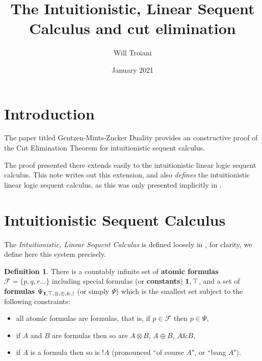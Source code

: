 \documentclass[12pt]{article}
\title{The Intuitionistic, Linear Sequent Calculus and cut elimination}
\author{Will Troiani}
\date{January 2021}
\theoremstyle{plain}
\theoremstyle{definition}
\newtheorem{defn}[thm]{Definition} %
\newcommand{\scr}[1]{\mathscr{#1}}
\begin{document}
\maketitle
\tableofcontents

\section{Introduction}
The paper titled Gentzen-Mints-Zucker Duality \cite{GMZ} provides an constructive proof  of the Cut Elimination Theorem for intuitionistic sequent calculus.

The proof presented there extends easily to the intuitionistic linear logic sequent calculus. This note writes out this extension, and also \emph{defines} the intuitionistic linear logic sequent calculus, as this was only presented implicitly in \cite{blind}.

\section{Intuitionistic Sequent Calculus}\label{Sec:intuitionistic_linear_sequent_calculus}
The \emph{Intuitionistic, Linear Sequent Calculus} is defined loosely in \cite[\S 11.1.2]{blind}, for clarity, we define here this system precisely.

\begin{defn}
There is a countably infinite set of \textbf{atomic formulas} $\scr{F} = \lbrace p,q,r\hdots \rbrace$ including special formulas (or \textbf{constants}) $\bold{1}, \top$, and a set of \textbf{formulas} $\Psi_{\bold{1},\top,\otimes, \oplus, \&, !}$ (or simply $\Psi$) which is the smallest set subject to the following constraints:
\begin{itemize}
    \item all atomic formulas are formulas, that is, if $p \in \scr{F}$ then $p \in \Psi$,
    \item if $A$ and $B$ are formulas then so are $A \otimes B$, $A \oplus B$, $A \& B$,
    \item if $A$ is a formula then so is $!A$ (pronounced ``of course $A$", or ``bang $A$").
\end{itemize}
\end{defn}
\end{document}
